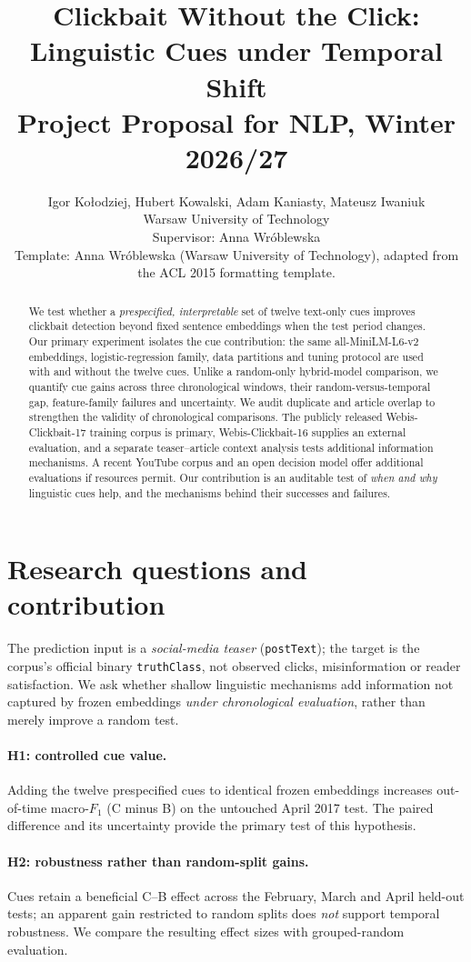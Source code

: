 \documentclass[11pt]{article}
\title{Clickbait Without the Click:\\Linguistic Cues under Temporal Shift\\Project Proposal for NLP, Winter 2026/27}
\author{Igor Ko{\l}odziej, Hubert Kowalski, Adam Kaniasty, Mateusz Iwaniuk \\
Warsaw University of Technology\\Supervisor: Anna Wr{\'o}blewska\\{\footnotesize Template: Anna Wr{\'o}blewska (Warsaw University of Technology), adapted from the ACL 2015 formatting template.}}
\date{}
\newcommand{\mF}{macro-$F_1$}
\begin{document}
\maketitle
\begin{abstract}
We test whether a \emph{prespecified, interpretable} set of twelve text-only cues improves clickbait detection beyond fixed sentence embeddings when the test period changes. Our primary experiment isolates the cue contribution: the same all-MiniLM-L6-v2 embeddings, logistic-regression family, data partitions and tuning protocol are used with and without the twelve cues. Unlike a random-only hybrid-model comparison, we quantify cue gains across three chronological windows, their random-versus-temporal gap, feature-family failures and uncertainty. We audit duplicate and article overlap to strengthen the validity of chronological comparisons. The publicly released Webis-Clickbait-17 training corpus is primary, Webis-Clickbait-16 supplies an external evaluation, and a separate teaser--article context analysis tests additional information mechanisms. A recent YouTube corpus and an open decision model offer additional evaluations if resources permit. Our contribution is an auditable test of \emph{when and why} linguistic cues help, and the mechanisms behind their successes and failures.
\end{abstract}

\section{Research questions and contribution}
The prediction input is a \emph{social-media teaser} (\texttt{postText}); the target is the corpus's official binary \texttt{truthClass}, not observed clicks, misinformation or reader satisfaction. We ask whether shallow linguistic mechanisms add information not captured by frozen embeddings \emph{under chronological evaluation}, rather than merely improve a random test.
\paragraph{H1: controlled cue value.} Adding the twelve prespecified cues to identical frozen embeddings increases out-of-time \mF{} (C minus B) on the untouched April 2017 test. The paired difference and its uncertainty provide the primary test of this hypothesis.
\paragraph{H2: robustness rather than random-split gains.} Cues retain a beneficial C--B effect across the February, March and April held-out tests; an apparent gain restricted to random splits does \emph{not} support temporal robustness. We compare the resulting effect sizes with grouped-random evaluation.
\end{document}
